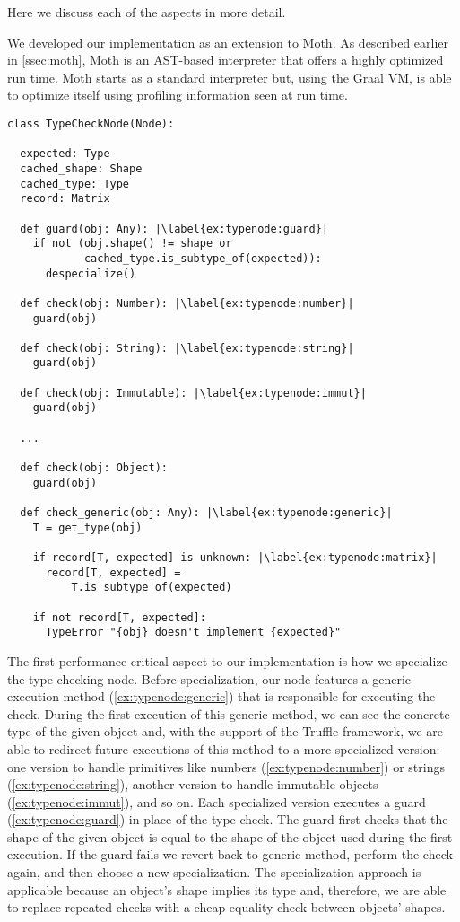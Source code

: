 Here we discuss each of the aspects in more detail.

We developed our implementation as an extension to Moth.
As described earlier in \cref{ssec:moth},
Moth is an AST-based interpreter that offers a highly optimized run time.
Moth starts as a standard interpreter but,
using the Graal VM,
is able to optimize itself using profiling information seen at run time. 

\begin{lstlisting}[label={ex:typenode},escapechar=|,caption={An illustration of the type checking node that support type checking},float,floatplacement=htbp]
class TypeCheckNode(Node):

  expected: Type
  cached_shape: Shape
  cached_type: Type
  record: Matrix
  
  def guard(obj: Any): |\label{ex:typenode:guard}|
    if not (obj.shape() != shape or
            cached_type.is_subtype_of(expected)):
      despecialize()

  def check(obj: Number): |\label{ex:typenode:number}|
    guard(obj)

  def check(obj: String): |\label{ex:typenode:string}|
    guard(obj)

  def check(obj: Immutable): |\label{ex:typenode:immut}|
    guard(obj)

  ...

  def check(obj: Object):
    guard(obj)
  
  def check_generic(obj: Any): |\label{ex:typenode:generic}|
    T = get_type(obj)
    
    if record[T, expected] is unknown: |\label{ex:typenode:matrix}|
      record[T, expected] =
          T.is_subtype_of(expected)

    if not record[T, expected]:
      TypeError "{obj} doesn't implement {expected}"
\end{lstlisting}

The first performance-critical aspect to our implementation
is how we specialize the type checking node.
Before specialization,
our node features a generic execution method
(\cref{ex:typenode:generic})
that is responsible for executing the check.
During the first execution of this generic method,
we can see the concrete type of the given object and,
with the support of the Truffle framework,
we are able to redirect future executions of this method
to a more specialized version:
one version to handle primitives like
numbers (\cref{ex:typenode:number}) or strings (\cref{ex:typenode:string}),
another version to handle immutable objects (\cref{ex:typenode:immut}),
and so on.
Each specialized version executes a guard (\cref{ex:typenode:guard})
in place of the type check.
The guard first checks that the shape of the given object
is equal to the shape of the object
used during the first execution.
If the guard fails
we revert back to generic method,
perform the check again,
and then choose a new specialization.
The specialization approach is applicable because
an object's shape implies its type and, therefore,
we are able to replace repeated checks
with a cheap equality check between objects' shapes.

